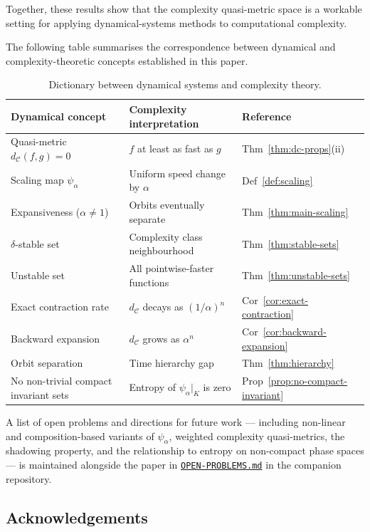 \documentclass[11pt,a4paper]{article}
\newcommand{\repourl}{https://github.com/gabayae/expansive-homeomorphisms-complexity-qmetric}
\theoremstyle{plain}
\theoremstyle{definition}
\newcommand{\C}{\mathcal{C}}
\begin{document}
Together, these results show that the complexity quasi-metric
space is a workable setting for applying dynamical-systems methods
to computational complexity.

\medskip
The following table summarises the correspondence between dynamical
and complexity-theoretic concepts established in this paper.

\begin{table}[H]
\centering
\renewcommand{\arraystretch}{1.3}
\begin{tabular}{lll}
\hline
\textbf{Dynamical concept} & \textbf{Complexity interpretation} & \textbf{Reference} \\
\hline
Quasi-metric $d_\C(f,g)=0$ & $f$ at least as fast as $g$ & Thm~\ref{thm:dc-props}(ii)\\
Scaling map $\psi_\alpha$ & Uniform speed change by $\alpha$ & Def~\ref{def:scaling}\\
Expansiveness ($\alpha\neq 1$) & Orbits eventually separate & Thm~\ref{thm:main-scaling}\\
$\delta$-stable set & Complexity class neighbourhood & Thm~\ref{thm:stable-sets}\\
Unstable set & All pointwise-faster functions & Thm~\ref{thm:unstable-sets}\\
Exact contraction rate & $d_\C$ decays as $(1/\alpha)^n$ & Cor~\ref{cor:exact-contraction}\\
Backward expansion & $d_\C$ grows as $\alpha^n$ & Cor~\ref{cor:backward-expansion}\\
Orbit separation & Time hierarchy gap & Thm~\ref{thm:hierarchy}\\
No non-trivial compact invariant sets & Entropy of $\psi_\alpha|_K$ is zero & Prop~\ref{prop:no-compact-invariant}\\
\hline
\end{tabular}
\caption{Dictionary between dynamical systems and complexity theory.}
\label{tab:dictionary}
\end{table}

A list of open problems and directions for future work --- including
non-linear and composition-based variants of $\psi_\alpha$, weighted
complexity quasi-metrics, the shadowing property, and the
relationship to entropy on non-compact phase spaces --- is
maintained alongside the paper in
\href{\repourl/blob/main/OPEN-PROBLEMS.md}{\texttt{OPEN-PROBLEMS.md}}
in the companion repository.

\subsection*{Acknowledgements}
\end{document}
